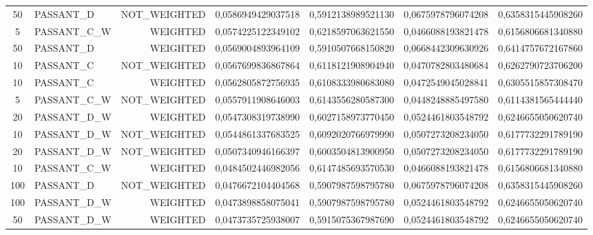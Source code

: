 \begin{table}[H]
{\begin{tabular}{ c l r c c c c }
				50 &  PASSANT\_D & NOT\_WEIGHTED & 0,0586949429037518 & 0,5912138989521130 & 0,0675978796074208 & 0,6358315445908260 \\
				
				5 & PASSANT\_C\_W &   WEIGHTED & 0,0574225122349102 & 0,6218597063621550 & 0,0466088193821478 & 0,6156806681340880 \\
				
				50 &  PASSANT\_D &   WEIGHTED & 0,0569004893964109 & 0,5910507668150820 & 0,0668442309630926 & 0,6414757672167860 \\
				
				10 &  PASSANT\_C & NOT\_WEIGHTED & 0,0567699836867864 & 0,6118121908904940 & 0,0470782803480684 & 0,6262790723706200 \\
				
				10 &  PASSANT\_C &   WEIGHTED & 0,0562805872756935 & 0,6108333980683080 & 0,0472549045028841 & 0,6305515857308470 \\
				
				5 & PASSANT\_C\_W & NOT\_WEIGHTED & 0,0557911908646003 & 0,6143556280587300 & 0,0448248885497580 & 0,6114381565444440 \\
				
				20 & PASSANT\_D\_W &   WEIGHTED & 0,0547308319738990 & 0,6027158973770450 & 0,0524461803548792 & 0,6246655050620740 \\
				
				10 & PASSANT\_D\_W & NOT\_WEIGHTED & 0,0544861337683525 & 0,6092020766979990 & 0,0507273208234050 & 0,6177732291789190 \\
				
				20 & PASSANT\_D\_W & NOT\_WEIGHTED & 0,0507340946166397 & 0,6003504813900950 & 0,0507273208234050 & 0,6177732291789190 \\
				
				10 & PASSANT\_C\_W &   WEIGHTED & 0,0484502446982056 & 0,6147485693570530 & 0,0466088193821478 & 0,6156806681340880 \\
				
				100 &  PASSANT\_D & NOT\_WEIGHTED & 0,0476672104404568 & 0,5907987598795780 & 0,0675978796074208 & 0,6358315445908260 \\
				
				100 & PASSANT\_D\_W &   WEIGHTED & 0,0473898858075041 & 0,5907987598795780 & 0,0524461803548792 & 0,6246655050620740 \\
				
				50 & PASSANT\_D\_W &   WEIGHTED & 0,0473735725938007 & 0,5915075367987690 & 0,0524461803548792 & 0,6246655050620740 \\
				

\end{tabular}}
\end{table}
